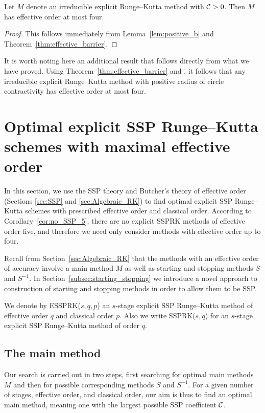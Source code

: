 \documentclass[final]{siamltex}  %
\begin{document}
\begin{corollary}\label{cor:no_SSP_5}
    Let $M$ denote an irreducible explicit Runge--Kutta method with $\mathcal{C}>0$.
    Then $M$ has effective order at most four.
\end{corollary}
\begin{proof}
	This follows immediately from Lemma~\ref{lem:positive_b} and 
	Theorem~\ref{thm:effective_barrier}.
\end{proof}

\begin{remark}
    It is worth noting here an additional result that 
    follows directly from what we have proved.
    Using Theorem~\ref{thm:effective_barrier} and \cite[Theorem~4.1]{dahlquist2006}, 
    it follows that any irreducible explicit Runge--Kutta method with positive radius of
    circle contractivity has effective order at most four.
\end{remark}


\section{Optimal explicit SSP Runge--Kutta schemes with maximal effective order}\label{sec:optimal_ESSPRK}
In this section, we use the SSP theory and Butcher's theory of effective
order (Sections \ref{sec:SSP} and \ref{sec:Algebraic_RK}) to find
optimal explicit SSP Runge--Kutta schemes with prescribed effective
order and classical order.
According to Corollary~\ref{cor:no_SSP_5}, there are no explicit SSPRK methods of
effective order five, and therefore we need only consider methods with
effective order up to four.

Recall from Section~\ref{sec:Algebraic_RK} that the methods with
an effective order of accuracy involve a main method $M$ as well as starting and
stopping methods $S$ and $S^{-1}$.
In Section~\ref{subsec:starting_stopping} we introduce a novel approach
to construction of starting and stopping methods in order to allow
them to be SSP.

We denote by ESSPRK($s,q,p$) an $s$-stage explicit SSP Runge--Kutta
method of effective order $q$ and classical order $p$.
Also we write SSPRK($s,q$) for an $s$-stage explicit SSP Runge--Kutta
method of order $q$.

\subsection{The main method}\label{subsec:main_method}
Our search is carried out in two
steps, first searching for optimal main methods $M$ and then for
possible corresponding methods $S$ and $S^{-1}$.
For a given number of stages, effective order, and classical order,
our aim is thus to find an optimal main method, meaning one with the 
largest possible SSP coefficient $\mathcal{C}$.
\end{document}
